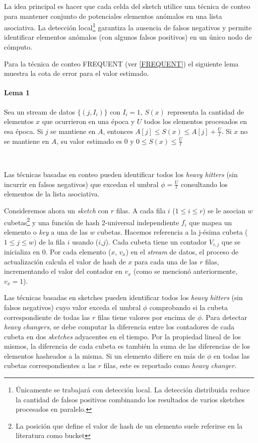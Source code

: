 \documentclass[a4paper,10pt, oneside]{article}
\begin{document}
La idea principal es hacer que cada celda del sketch utilice una técnica de conteo para mantener conjunto de potenciales elementos anómalos en una lista asociativa. La detección local\footnote{Únicamente se trabajará con detección local. La detección distribuida reduce la cantidad de falsos positivos combinando los resultados de varios sketches procesados en paralelo.} garantiza la ausencia de falsos negativos y permite identificar elementos anómalos (con algunos falsos positivos) en un único nodo de cómputo.

Para la técnica de conteo FREQUENT (ver \ref{FREQUENT}) el siguiente lema muestra la cota de error para el valor estimado\cite{Misra1982143}.

\paragraph{Lema 1} Sea un stream de datos $\{(j, I_i)\}$ con $I_i=1$, $S(x)$ representa la cantidad de elementos $x$ que ocurrieron en una época y $U$ todos los elementos procesados en esa época. Si $j$ se mantiene en $A$, entonces $A[j] \leq S(x) \leq A[j] + \frac{U}{l}$. Si $x$ no se mantiene en $A$, su valor estimado es $0$ y $0 \leq S(x) \leq \frac{U}{l}$

\

Las técnicas basadas en conteo pueden identificar todos los \textit{heavy hitters} (sin incurrir en falsos negativos) que excedan el umbral $\phi = \frac{U}{l}$ consultando los elementos de la lista asociativa.

Consideremos ahora un \textit{sketch} con $r$ filas. A cada fila $i$ ($1 \leq i \leq r$) se le asocian $w$ cubetas\footnote{La posición que define el valor de hash de un elemento suele referirse en la literatura como bucket} y una función de hash 2-universal independiente $f_i$ que mapea un elemento o \textit{key} a una de las $w$ cubetas. Hacemos referencia a la j-ésima cubeta ($1 \leq j \leq w$) de la fila $i$ usando ($i$,$j$). Cada cubeta tiene un contador $V_{i,j}$ que se inicializa en 0. Por cada elemento ($x$, $v_x$) en el \textit{stream} de datos, el proceso de actualización calcula el valor de hash de $x$ para cada una de las $r$ filas, incrementando el valor del contador en $v_x$ (como se mencionó anteriormente, $v_x=1$).

Las técnicas basadas en sketches pueden identificar todos los \textit{heavy hitters} (sin falsos negativos) cuyo valor exceda el umbral $\phi$ comprobando si la cubeta correspondiente de todas las $r$ filas tiene valores por encima de $\phi$. Para detectar \textit{heavy changers}, se debe computar la diferencia entre los contadores de cada cubeta en dos \textit{sketches} adyacentes en el tiempo. Por la propiedad lineal de los mismos, la diferencia de cada cubeta es también la suma de las diferencias de los elementos hasheados a la misma. Si un elemento difiere en más de $\phi$ en todas las cubetas correspondientes a las $r$ filas, este es reportado como \textit{heavy changer}.
\end{document}
